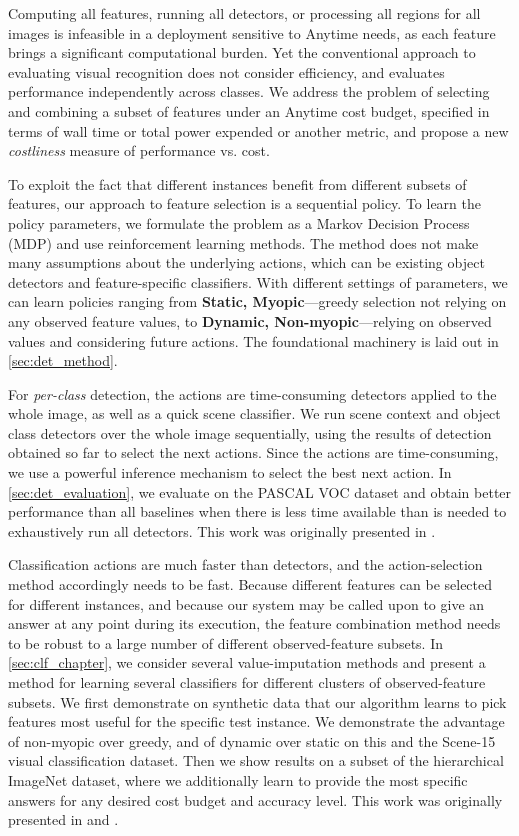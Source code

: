 Computing all features, running all detectors, or processing all regions for all images is infeasible in a deployment sensitive to Anytime needs, as each feature brings a significant computational burden.
Yet the conventional approach to evaluating visual recognition does not consider efficiency, and evaluates performance independently across classes.
We address the problem of selecting and combining a subset of features under an Anytime cost budget, specified in terms of wall time or total power expended or another metric, and propose a new \emph{costliness} measure of performance vs. cost.

To exploit the fact that different instances benefit from different subsets of features, our approach to feature selection is a sequential policy.
To learn the policy parameters, we formulate the problem as a Markov Decision Process (MDP) and use reinforcement learning methods.
The method does not make many assumptions about the underlying actions, which can be existing object detectors and feature-specific classifiers.
With different settings of parameters, we can learn policies ranging from \textbf{Static, Myopic}---greedy selection not relying on any observed feature values, to \textbf{Dynamic, Non-myopic}---relying on observed values and considering future actions.
The foundational machinery is laid out in \autoref{sec:det_method}.

For \emph{per-class} detection, the actions are time-consuming detectors applied to the whole image, as well as a quick scene classifier.
We run scene context and object class detectors over the whole image sequentially, using the results of detection obtained so far to select the next actions.
Since the actions are time-consuming, we use a powerful inference mechanism to select the best next action.
In \autoref{sec:det_evaluation}, we evaluate on the PASCAL VOC dataset and obtain better performance than all baselines when there is less time available than is needed to exhaustively run all detectors.
This work was originally presented in \cite{Karayev-NIPS-2012}.

Classification actions are much faster than detectors, and the action-selection method accordingly needs to be fast.
Because different features can be selected for different instances, and because our system may be called upon to give an answer at any point during its execution, the feature combination method needs to be robust to a large number of different observed-feature subsets.
In \autoref{sec:clf_chapter}, we consider several value-imputation methods and present a method for learning several classifiers for different clusters of observed-feature subsets.
We first demonstrate on synthetic data that our algorithm learns to pick features most useful for the specific test instance.
We demonstrate the advantage of non-myopic over greedy, and of dynamic over static on this and the Scene-15 visual classification dataset.
Then we show results on a subset of the hierarchical ImageNet dataset, where we additionally learn to provide the most specific answers for any desired cost budget and accuracy level.
This work was originally presented in \cite{Karayev-ICMLW-2013} and \cite{Karayev-CVPR-2014}.

